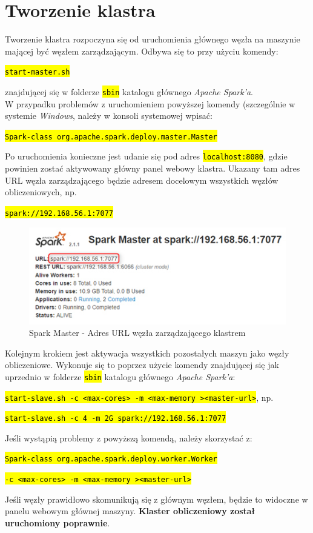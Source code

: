 \documentclass[a4paper,onecolumn,oneside,12pt]{memoir}
\begin{document}
{{\section{Tworzenie klastra}
Tworzenie klastra rozpoczyna się od uruchomienia głównego węzła na maszynie
mającej być węzłem zarządzającym.
Odbywa się to przy użyciu komendy: \vspace{2mm}

\centerline{\texttt{\hl{start-master.sh}}}
\vspace{2mm} znajdującej się w folderze \texttt{\hl{sbin}} katalogu głównego \textit{Apache Spark'a}. \\
W przypadku problemów z uruchomieniem powyższej komendy (szczególnie w systemie \textit{Windows}, należy w konsoli systemowej wpisać: \vspace{2mm}

\centerline{\texttt{\hl{Spark-class org.apache.spark.deploy.master.Master}}}
\vspace{2mm}Po uruchomienia konieczne jest udanie się pod adres \texttt{\hl{localhost:8080}}, gdzie powinien zostać aktywowany główny panel webowy klastra. Ukazany tam adres URL węzła zarządzającego będzie adresem
docelowym wszystkich węzłów obliczeniowych, np.\vspace{2mm}
\centerline{\texttt{\hl{spark://192.168.56.1:7077}}}
\begin{figure}[h]
	\centering
	\includegraphics[width=1\linewidth]{spark-working}
	\caption{Spark Master - Adres URL węzła zarządzającego klastrem}
	\label{fig:stronaTytulowa}
\end{figure}

Kolejnym krokiem jest aktywacja wszystkich pozostałych maszyn jako węzły obliczeniowe. Wykonuje się to poprzez użycie komendy znajdującej się jak uprzednio w folderze \texttt{\hl{sbin}} katalogu głównego \textit{Apache Spark'a}: \\ \vspace{2mm}
\centerline{\texttt{\hl{start-slave.sh -c <max-cores> -m <max-memory ><master-url>}}, np.}
\centerline{\texttt{\hl{start-slave.sh -c 4 -m 2G spark://192.168.56.1:7077}}}
Jeśli wystąpią problemy z powyższą komendą, należy skorzystać z:\\
\centerline{\texttt{\hl{Spark-class org.apache.spark.deploy.worker.Worker }}}
\centerline{\texttt{\hl{-c <max-cores> -m <max-memory ><master-url>}}}
Jeśli węzły prawidłowo skomunikują się z głównym węzłem, będzie to widoczne
w panelu webowym głównej maszyny. \textbf{Klaster obliczeniowy został uruchomiony poprawnie}.
\pagebreak
\vspace*{1mm}
}}
\end{document}
